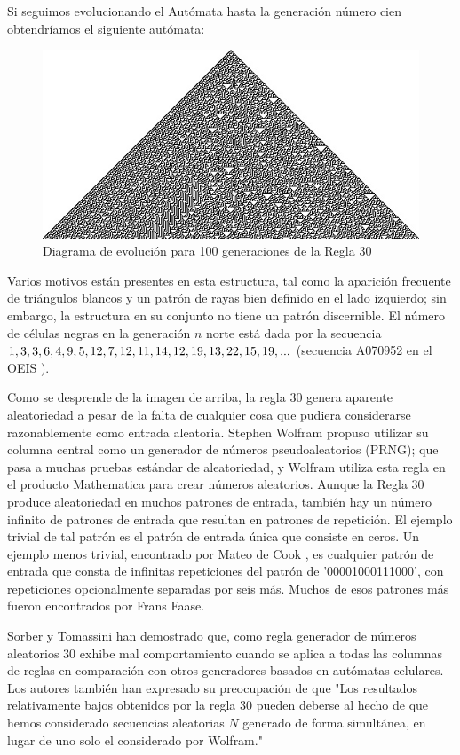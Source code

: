 Si seguimos evolucionando el Autómata hasta la generación número cien obtendríamos el siguiente autómata:

\begin{figure}[H]
\centering
\includegraphics[scale=1]{imagenes/rule_30_3.jpg}
\caption{Diagrama de evolución para 100 generaciones de la Regla 30}
\end{figure}

Varios motivos están presentes en esta estructura, tal como la aparición frecuente de triángulos blancos y un patrón de rayas bien definido en el lado izquierdo; sin embargo, la estructura en su conjunto no tiene un patrón discernible. El número de células negras en la generación $n$ norte está dada por la secuencia $1, 3, 3, 6, 4, 9, 5, 12, 7, 12, 11, 14, 12, 19, 13,\\ 22, 15, 19, ... $ (secuencia A070952 en el OEIS ).

Como se desprende de la imagen de arriba, la regla 30 genera aparente aleatoriedad a pesar de la falta de cualquier cosa que pudiera considerarse razonablemente como entrada aleatoria. Stephen Wolfram propuso utilizar su columna central como un generador de números pseudoaleatorios (PRNG); que pasa a muchas pruebas estándar de aleatoriedad, y Wolfram utiliza esta regla en el producto Mathematica para crear números aleatorios. Aunque la Regla 30 produce aleatoriedad en muchos patrones de entrada, también hay un número infinito de patrones de entrada que resultan en patrones de repetición. El ejemplo trivial de tal patrón es el patrón de entrada única que consiste en ceros. Un ejemplo menos trivial, encontrado por Mateo de Cook , es cualquier patrón de entrada que consta de infinitas repeticiones del patrón de '00001000111000', con repeticiones opcionalmente separadas por seis más. Muchos de esos patrones más fueron encontrados por Frans Faase.

Sorber y Tomassini han demostrado que, como regla generador de números aleatorios 30 exhibe mal comportamiento cuando se aplica a todas las columnas de reglas en comparación con otros generadores basados en autómatas celulares. Los autores también han expresado su preocupación de que "Los resultados relativamente bajos obtenidos por la regla 30 pueden deberse al hecho de que hemos considerado secuencias aleatorias $N$ generado de forma simultánea, en lugar de uno solo el considerado por Wolfram."

